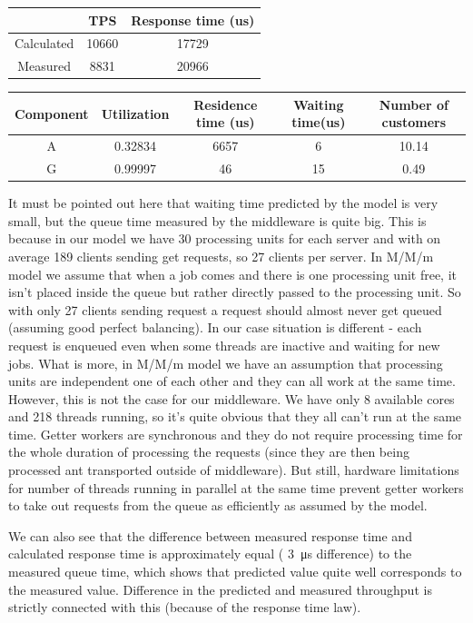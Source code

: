 \documentclass[11pt]{article}
\begin{document}
{\small
\begin{center}
\begin{tabular}{|c|c|c|}
\hline & TPS & Response time (us) \\
\hline Calculated &10660 & 17729 \\
\hline Measured & 8831 & 20966 \\
\hline
\end{tabular}
\end{center}

\begin{center}
\begin{tabular}{|c|c|c|c|c|}
\hline Component & Utilization & Residence time (us) & Waiting time(us) & Number of customers\\
\hline A &0.32834  &  6657 & 6 & 10.14 \\
\hline G & 0.99997 & 46  & 15 & 0.49 \\
\hline
\end{tabular}
\end{center}
}

It must be pointed out here that waiting time predicted by the model is very small, but the queue time measured by the middleware is quite big.
This is because in our model we have 30 processing units for each server and with on average 189 clients sending get requests, so 27 clients per server. In M/M/m model we assume that when a job comes and there is one processing unit free, it isn't placed inside the queue but rather directly passed to the processing unit. So with only 27 clients sending request a request should almost never get queued (assuming good perfect balancing). In our case situation is different - each request is enqueued even when some threads are inactive and waiting for new jobs. What is more, in M/M/m model we have an assumption that processing units are independent one of each other and they can all work at the same time. However, this is not the case for our middleware. We have only 8 available cores and 218 threads running, so it's quite obvious that they all can't run at the same time. Getter workers are synchronous and they do not require processing time for the whole duration of processing the requests (since they are then being processed ant transported outside of middleware). But still, hardware limitations for number of threads running in parallel at the same time prevent getter workers to take out requests from the queue as efficiently as assumed by the model.

We can also see that the difference between measured response time and calculated response time is approximately equal  ( \SI{3}{\micro\second} difference) to the measured queue time, which shows that predicted value quite well corresponds to the measured value. Difference in the predicted and measured throughput is strictly connected with this (because of the response time law).
\end{document}

